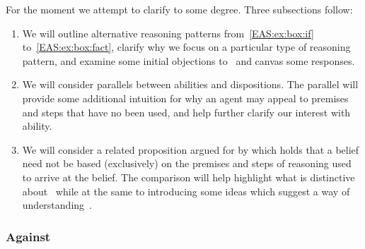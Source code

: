 \begin{note}
  For the moment we attempt to clarify \EAS{} to some degree.
  Three subsections follow:

  \begin{enumerate}
  \item We will outline alternative reasoning patterns from~\ref{EAS:ex:box:if} to~\ref{EAS:ex:box:fact}, clarify why we focus on a particular type of reasoning pattern, and examine some initial objections to~\EAS{} and canvas some responses.
  \item We will consider parallels between abilities and dispositions.
    The parallel will provide some additional intuition for why an agent may appeal to premises and steps that have no been used, and help further clarify our interest with ability.
  \item We will consider a related proposition argued for by \citeauthor{Moretti:2019wx} which holds that a belief need not be based (exclusively) on the premises and steps of reasoning used to arrive at the belief.
    The comparison will help highlight what is distinctive about~\EAS{} while at the same to introducing some ideas which suggest a way of understanding~\EAS{}.
  \end{enumerate}
\end{note}

\subsubsection{Against \EAS{}}

